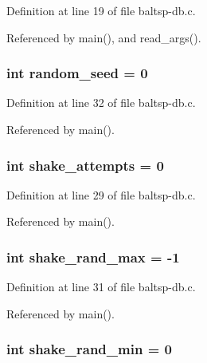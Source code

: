 Definition at line 19 of file baltsp-db.c.

Referenced by main(), and read\_\-args().\hypertarget{bin_2baltsp-db_8c_d9059bc845096b2f05414a66c836b4ee}{
\subsubsection[{random\_\-seed}]{\setlength{\rightskip}{0pt plus 5cm}int {\bf random\_\-seed} = 0}}
\label{bin_2baltsp-db_8c_d9059bc845096b2f05414a66c836b4ee}




Definition at line 32 of file baltsp-db.c.

Referenced by main().\hypertarget{bin_2baltsp-db_8c_a4451667ac0b07bcf8396ecdb8c90f6e}{
\subsubsection[{shake\_\-attempts}]{\setlength{\rightskip}{0pt plus 5cm}int {\bf shake\_\-attempts} = 0}}
\label{bin_2baltsp-db_8c_a4451667ac0b07bcf8396ecdb8c90f6e}




Definition at line 29 of file baltsp-db.c.

Referenced by main().\hypertarget{bin_2baltsp-db_8c_bcacd5fab89a9f3eaab5401c5001b4c5}{
\subsubsection[{shake\_\-rand\_\-max}]{\setlength{\rightskip}{0pt plus 5cm}int {\bf shake\_\-rand\_\-max} = -1}}
\label{bin_2baltsp-db_8c_bcacd5fab89a9f3eaab5401c5001b4c5}




Definition at line 31 of file baltsp-db.c.

Referenced by main().\hypertarget{bin_2baltsp-db_8c_b7fc57ece1162e77f74b4803961b72cb}{
\subsubsection[{shake\_\-rand\_\-min}]{\setlength{\rightskip}{0pt plus 5cm}int {\bf shake\_\-rand\_\-min} = 0}}
\label{bin_2baltsp-db_8c_b7fc57ece1162e77f74b4803961b72cb}




